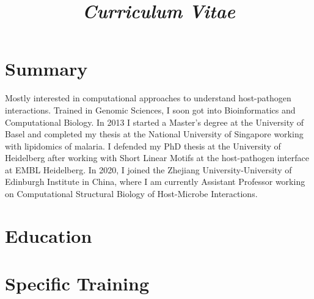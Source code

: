 \documentclass[11pt,a4paper,sans]{moderncv} %
\title{\emph{Curriculum Vitae}}
\begin{document}
\makecvtitle %
\vspace{-1.2cm}
\section{Summary}
Mostly interested in computational approaches to understand host-pathogen interactions. Trained in Genomic Sciences, I soon got into Bioinformatics and Computational Biology. In 2013 I started a Master's degree at the University of Basel and completed my thesis at the National University of Singapore working with lipidomics of malaria. I defended my PhD thesis at the University of Heidelberg after working with Short Linear Motifs at the host-pathogen interface at EMBL Heidelberg. In 2020, I joined the Zhejiang University-University of Edinburgh Institute in China, where I am currently Assistant Professor working on Computational Structural Biology of Host-Microbe Interactions.

\vspace{0.5cm}

\section{Education}


\vspace{0.5cm}

\section{Specific Training}
\end{document}
